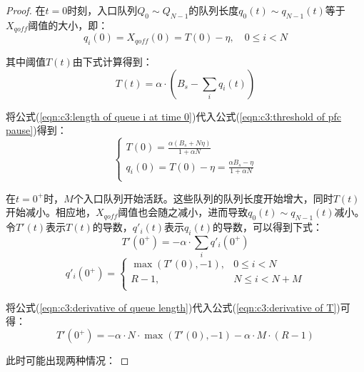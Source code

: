 \begin{proof}
  在$t=0$时刻，入口队列$Q_0 \sim Q_{N-1}$的队列长度$q_0(t) \sim q_{N-1}(t)$等于$X_{\mathit{qoff}}$阈值的大小，即：
  \begin{equation}
    q_i(0)=X_{\mathit{qoff}}(0)=T(0)-\eta, \quad 0 \leqslant i < N
    \label{eqn:c3:length of queue i at time 0}
  \end{equation}

  其中阈值$T(t)$由下式计算得到：
  \begin{equation}
    T(t)=\alpha \cdot (B_s - \sum_{i}q_i(t))
    \label{eqn:c3:threshold of pfc pause}
  \end{equation} 
  
  将公式(\ref{eqn:c3:length of queue i at time 0})代入公式(\ref{eqn:c3:threshold of pfc pause})得到：
  \begin{equation}
    \begin{cases}
      T(0)=\frac{\alpha(B_s+N \eta)}{1+\alpha N} \\
      q_i(0)=T(0)-\eta=\frac{\alpha B_s-\eta}{1+\alpha N} \\
    \end{cases}
    \label{eqn:c3:substitute result}
  \end{equation}

  在$t=0^+$时，$M$个入口队列开始活跃。这些队列的队列长度开始增大，同时$T(t)$开始减小。相应地，$X_{\mathit{qoff}}$阈值也会随之减小，进而导致$q_0(t) \sim q_{N-1}(t)$减小。令$T'(t)$表示$T(t)$的导数，$q'_i(t)$表示$q_i(t)$的导数，可以得到下式：
  \begin{equation}
    T'(0^+)=-\alpha \cdot \sum_{i}q'_i(0^+)
    \label{eqn:c3:derivative of T}
  \end{equation}
  \begin{equation}
    q'_i(0^+)=
      \begin{cases}
        \max (T'(0),-1), & 0 \leqslant i < N \\
        R-1, & N \leqslant i < N+M \\
      \end{cases}
    \label{eqn:c3:derivative of queue length}
  \end{equation}  

  将公式(\ref{eqn:c3:derivative of queue length})代入公式(\ref{eqn:c3:derivative of T})可得：
  \begin{equation}
    T'(0^+)=-\alpha \cdot N \cdot \max(T'(0),-1)-\alpha \cdot M
    \cdot (R-1)
  \end{equation}

  此时可能出现两种情况：


\end{proof}
